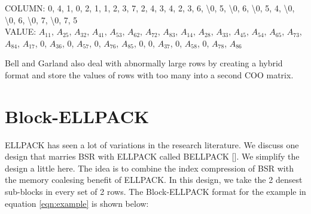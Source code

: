 COLUMN: 0, 4, 1, 0, 2, 1, 1, 2, 3, 7, 2, 4, 3, 4, 2, 3, 6, \textbackslash 0, 5, \textbackslash 0, 6, \textbackslash 0, 5, 4, \textbackslash 0, \textbackslash 0, 6, \textbackslash 0, 7, \textbackslash 0, 7, 5\\
VALUE: $A_{11}$, $A_{25}$, $A_{32}$, $A_{41}$, $A_{53}$, $A_{62}$, $A_{72}$, $A_{83}$, $A_{14}$, $A_{28}$, $A_{33}$, $A_{45}$, $A_{54}$, $A_{65}$, $A_{73}$, $A_{84}$, $A_{17}$, $0$, $A_{36}$, $0$, $A_{57}$, $0$, $A_{76}$, $A_{85}$, $0$, $0$, $A_{37}$, $0$, $A_{58}$, $0$, $A_{78}$, $A_{86}$ \par
Bell and Garland also deal with abnormally large rows by creating a hybrid format and store the values of rows with too many into a second COO matrix.
\section{Block-ELLPACK}
ELLPACK has seen a lot of variations in the research literature. We discuss one design that marries BSR with ELLPACK called BELLPACK [\cite{prelim:choi}]. We simplify the design a little here. The idea is to combine the index compression of BSR with the memory coalesing benefit of ELLPACK. In this design, we take the 2 densest sub-blocks in every set of 2 rows. The Block-ELLPACK format for the example in equation \ref{eqn:example} is shown below:\\

